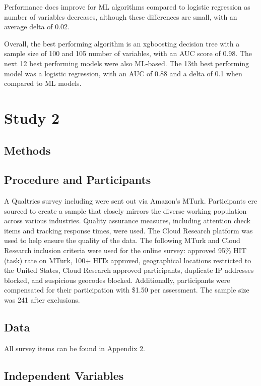 \documentclass[
  man]{apa7}
\begin{document}
Performance does improve for ML algorithms compared to logistic regression as number of variables decreases, although these differences are small, with an average delta of 0.02.

Overall, the best performing algorithm is an xgboosting decision tree with a sample size of 100 and 105 number of variables, with an AUC score of 0.98. The next 12 best performing models were also ML-based. The 13th best performing model was a logistic regression, with an AUC of 0.88 and a delta of 0.1 when compared to ML models.

\section{Study 2}\label{study-2}

\subsection{Methods}\label{methods-1}

\subsection{Procedure and Participants}\label{procedure-and-participants-1}

A Qualtrics survey including were sent out via Amazon's MTurk. Participants ere sourced to create a sample that closely mirrors the diverse working population across various industries. Quality assurance measures, including attention check items and tracking response times, were used. The Cloud Research platform was used to help ensure the quality of the data. The following MTurk and Cloud Research inclusion criteria were used for the online survey: approved 95\% HIT (task) rate on MTurk, 100+ HITs approved, geographical locations restricted to the United States, Cloud Research approved participants, duplicate IP addresses blocked, and suspicious geocodes blocked. Additionally, participants were compensated for their participation with \$1.50 per assessment. The sample size was 241 after exclusions.

\subsection{Data}\label{data-1}

All survey items can be found in Appendix 2.

\subsection{Independent Variables}\label{independent-variables-1}
\end{document}
